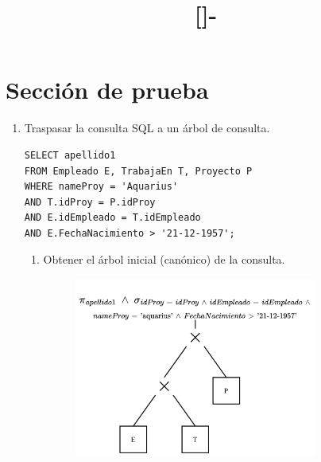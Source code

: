 \documentclass{templateNote}
\begin{document}

\title{[\asignatura]-\titulo}
\author{
    \autor
}
\portada
\margenes %

\section{Sección de prueba}
\begin{enumerate}
    \item Traspasar la consulta SQL a un árbol de consulta.
    \begin{tcolorbox}[
        colback=Verde!30,
        colframe=Verde!90!black]
        \begin{verbatim}
SELECT apellido1
FROM Empleado E, TrabajaEn T, Proyecto P
WHERE nameProy = 'Aquarius' 
AND T.idProy = P.idProy
AND E.idEmpleado = T.idEmpleado
AND E.FechaNacimiento > '21-12-1957';
        \end{verbatim}
    \end{tcolorbox}
    \begin{enumerate}
        \item Obtener el árbol inicial (canónico) de la consulta.
        \begin{figure}[H]
            \centering
            \includegraphics[width=0.8\textwidth]{img/E1-ArbolCanonico.png}
        \end{figure}


\end{enumerate}
\end{enumerate}
\end{document}
